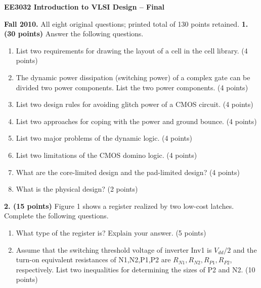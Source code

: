 \documentclass[10pt]{article}
\begin{document}
\begin{center}{\large\bfseries EE3032 Introduction to VLSI Design -- Final}\end{center}
\textbf{Fall 2010.} All eight original questions; printed total of 130 points retained.
\textbf{1. (30 points)} Answer the following questions.
\begin{enumerate}[label=(\alph*),leftmargin=7mm,itemsep=1pt]
\item List two requirements for drawing the layout of a cell in the cell library. (4 points)
\item The dynamic power dissipation (switching power) of a complex gate can be divided two power components. List the two power components. (4 points)
\item List two design rules for avoiding glitch power of a CMOS circuit. (4 points)
\item List two approaches for coping with the power and ground bounce. (4 points)
\item List two major problems of the dynamic logic. (4 points)
\item List two limitations of the CMOS domino logic. (4 points)
\item What are the core-limited design and the pad-limited design? (4 points)
\item What is the physical design? (2 points)
\end{enumerate}
\textbf{2. (15 points)} Figure 1 shows a register realized by two low-cost latches. Complete the following questions.
\begin{enumerate}[label=(\alph*),leftmargin=7mm]
\item What type of the register is? Explain your answer. (5 points)
\item Assume that the switching threshold voltage of inverter Inv1 is $V_{dd}/2$ and the turn-on equivalent resistances of N1,N2,P1,P2 are $R_{N1},R_{N2},R_{P1},R_{P2}$, respectively. List two inequalities for determining the sizes of P2 and N2. (10 points)
\end{enumerate}
\end{document}

